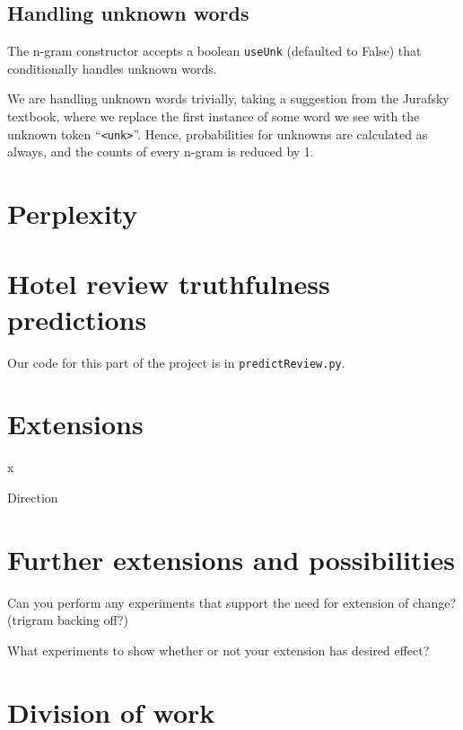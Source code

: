 \documentclass{article}
\begin{document}
\subsection{Handling unknown words}
The n-gram constructor accepts a boolean \texttt{useUnk} (defaulted to False) that conditionally handles unknown words.\par
We are handling unknown words trivially, taking a suggestion from the Jurafsky textbook, where we replace the first instance of some word we see with the unknown token ``\texttt{<unk>}''. Hence, probabilities for unknowns are calculated as always, and the counts of every n-gram is reduced by 1.

\section{Perplexity}
\lipsum[4]

\section{Hotel review truthfulness predictions}
Our code for this part of the project is in \texttt{predictReview.py}.
\lipsum[4]

\section{Extensions}
x\par
Direction\par
\lipsum[4]

\section{Further extensions and possibilities}
Can you perform any experiments that support the need for extension of change? (trigram backing off?)\par
What experiments to show whether or not your extension has desired effect?\par
\lipsum[4]

\section{Division of work}
\lipsum[4]
\end{document}
